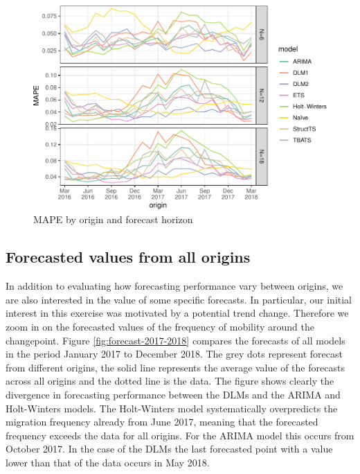 \documentclass[12pt, a4paper]{article}
\begin{document}
\begin{figure}[H]
  \caption{\label{fig:rmse-origins}MAPE by origin and forecast horizon}
\centering
\includegraphics[scale = 0.8]{../figs/freq--rmse-origins-1.pdf}
\end{figure}

\subsection{Forecasted values from all origins}\label{forecasted-values-from-all-origins}

In addition to evaluating how forecasting performance
vary between origins, we are also interested in the value of some specific forecasts.
In particular, our initial interest in this exercise was motivated by a
potential trend change. Therefore we zoom in on the forecasted values of
the frequency of mobility around the changepoint. Figure
\ref{fig:forecast-2017-2018} compares the forecasts of all models in the
period January 2017 to December 2018. The grey dots represent forecast
from different origins, the solid line represents the average value of
the forecasts across all origins and the dotted line is the data. The
figure shows clearly the divergence in forecasting performance between
the DLMs and the ARIMA and Holt-Winters models. The Holt-Winters model
systematically overpredicts the migration frequency already from June
2017, meaning that the forecasted frequency exceeds the data for all
origins. For the ARIMA model this occurs from October 2017. In the case
of the DLMs the last forecasted point with a value lower than that of
the data occurs in May 2018.
\end{document}
